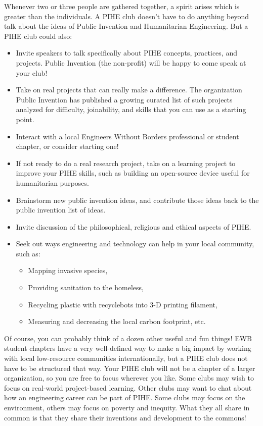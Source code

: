 \documentclass[
	fontsize=10pt, %
	twoside=false, %
	secnumdepth=1, %
]{kaobook}
\begin{document}
Whenever two or three people are gathered together, a spirit arises which is greater than the individuals. A PIHE club doesn’t have to do anything beyond talk about the ideas of Public Invention and Humanitarian Engineering. But a PIHE club could also:
\begin{itemize}
\item Invite speakers to talk specifically about PIHE concepts, practices, and projects. Public Invention (the non-profit) will be happy to come speak at your club!
\item Take on real projects that can really make a difference. The organization Public Invention has published a growing curated list of such projects analyzed for difficulty, joinability, and skills that you can use as a starting point.
\item Interact with a local Engineers Without Borders professional or student chapter, or consider starting one!
\item If not ready to do a real research project, take on a learning project to improve your PIHE skills, such as building an open-source device useful for humanitarian purposes.
\item Brainstorm new public invention ideas, and contribute those ideas back to the public invention list of ideas.
\item Invite discussion of the philosophical, religious and ethical aspects of PIHE.
\item Seek out ways engineering and technology can help in your local community, such as:
  \begin{itemize}
  \item Mapping invasive species,
  \item Providing sanitation to the homeless,
  \item Recycling plastic with recyclebots into 3-D printing filament,
  \item Measuring and decreasing the local carbon footprint, etc.
  \end{itemize}
\end{itemize}

Of course, you can probably think of a dozen other useful and fun
things! EWB student chapters have a very well-defined way to make a
big impact by working with local low-resource communities
internationally, but a PIHE club does not have to be structured that
way. Your PIHE club will not be a chapter of a larger organization, so
you are free to focus wherever you like. Some clubs may wish to focus
on real-world project-based learning. Other clubs may want to chat
about how an engineering career can be part of PIHE. Some clubs may
focus on the environment, others may focus on poverty and
inequity. What they all share in common is that they share their
inventions and development to the commons!
\end{document}
